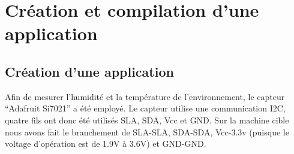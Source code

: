 \documentclass[letterpaper,10pt,french]{sphinxmanual}
\begin{document}
\section{Création et compilation d'une application}
\label{developpement:creation-et-compilation-d-une-application}

\subsection{Création d'une application}
\label{developpement:creation-d-une-application}
Afin de mesurer l’humidité et la température de l’environnement, le capteur ``Adafruit Si7021'' a été employé. Le capteur utilise une communication I2C, quatre fils ont donc été utilisés SLA, SDA, Vcc et GND. Sur la machine cible nous avons fait le branchement de SLA-SLA, SDA-SDA, Vcc-3.3v (puisque le voltage d’opération est de 1.9V à 3.6V) et GND-GND.
\end{document}
